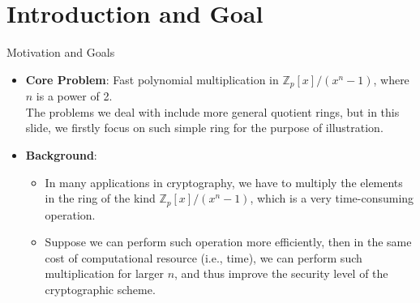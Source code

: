 \section{Introduction and Goal}

\begin{frame}{Motivation and Goals}
  \begin{itemize}
    \item<1-> \textbf{Core Problem}: Fast polynomial multiplication in 
          \(\mathbb{Z}_{p}[x]/(x^n - 1)\), where \(n\) is a power of 2.\\
          The problems we deal with include more general quotient rings, 
          but in this slide, we firstly focus on such simple ring 
          for the purpose of illustration.
    \item<2-> \textbf{Background}:
          \begin{itemize}
            \item In many applications in cryptography, we have to multiply the elements
                  in the ring of the kind \(\mathbb{Z}_{p}[x]/(x^n - 1)\), 
                  which is a very time-consuming operation.
            \item Suppose we can perform such operation more efficiently, 
                  then in the same cost of computational resource (i.e., time),
                  we can perform such multiplication for larger \(n\), 
                  and thus improve the security level of the cryptographic scheme.
          \end{itemize}
  \end{itemize}
\end{frame}

